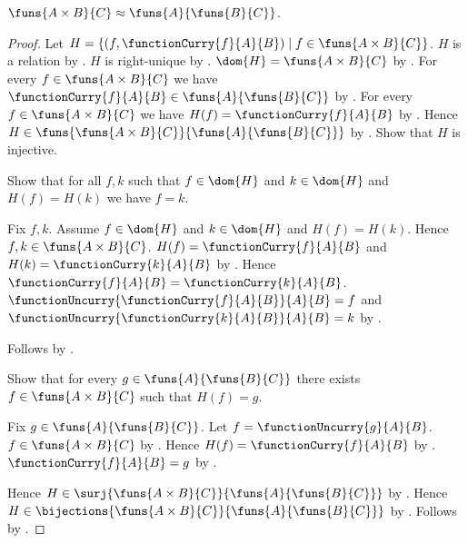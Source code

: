 \begin{theorem}\label{function_space_currying_equinumerous}
    $\funs{A\times B}{C}\approx\funs{A}{\funs{B}{C}}$.
\end{theorem}
\begin{proof}
    Let $H=\{(f,\functionCurry{f}{A}{B})
        \mid f\in\funs{A\times B}{C}\}$.
    $H$ is a relation by .
    $H$ is right-unique by .
    $\dom{H}=\funs{A\times B}{C}$
        by .
    For every $f\in\funs{A\times B}{C}$ we have
        $\functionCurry{f}{A}{B}\in\funs{A}{\funs{B}{C}}$
        by .
    For every $f\in\funs{A\times B}{C}$ we have
        $H(f)=\functionCurry{f}{A}{B}$
        by .
    Hence $H\in\funs{\funs{A\times B}{C}}{\funs{A}{\funs{B}{C}}}$
        by .
    Show that $H$ is injective.
    \begin{subproof}
        Show that for all $f,k$ such that $f\in\dom{H}$ and
            $k\in\dom{H}$ and $H(f)=H(k)$ we have $f=k$.
        \begin{subproof}
            Fix $f,k$.
            Assume $f\in\dom{H}$ and $k\in\dom{H}$ and $H(f)=H(k)$.
            Hence $f,k\in\funs{A\times B}{C}$.
            $H(f)=\functionCurry{f}{A}{B}$ and
                $H(k)=\functionCurry{k}{A}{B}$
                by .
            Hence $\functionCurry{f}{A}{B}=\functionCurry{k}{A}{B}$.
            $\functionUncurry{\functionCurry{f}{A}{B}}{A}{B}=f$ and
                $\functionUncurry{\functionCurry{k}{A}{B}}{A}{B}=k$
                by .
        \end{subproof}
        Follows by .
    \end{subproof}
    Show that for every $g\in\funs{A}{\funs{B}{C}}$ there exists
        $f\in\funs{A\times B}{C}$ such that $H(f)=g$.
    \begin{subproof}
        Fix $g\in\funs{A}{\funs{B}{C}}$.
        Let $f=\functionUncurry{g}{A}{B}$.
        $f\in\funs{A\times B}{C}$ by .
        Hence $H(f)=\functionCurry{f}{A}{B}$
            by .
        $\functionCurry{f}{A}{B}=g$ by .
    \end{subproof}
    Hence $H\in\surj{\funs{A\times B}{C}}{\funs{A}{\funs{B}{C}}}$
        by .
    Hence $H\in\bijections{\funs{A\times B}{C}}{\funs{A}{\funs{B}{C}}}$
        by .
    Follows by .
\end{proof}
